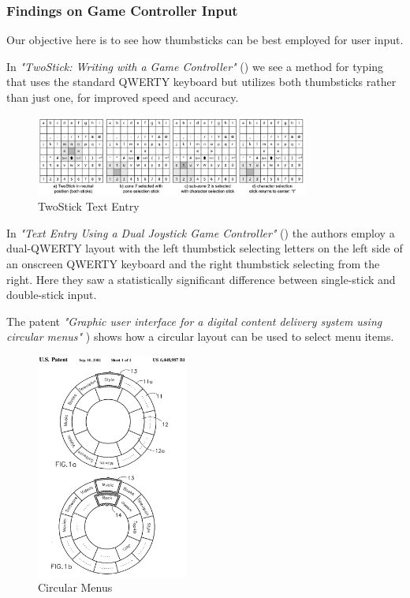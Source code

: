 \documentclass[
	letterpaper, %
]{jdf}
\begin{document}
\subsubsection{Findings on Game Controller Input}
Our objective here is to see how thumbsticks can be best employed for user input.

In \textit{"TwoStick: Writing with a Game Controller"} (\cite{twostick_2007}) we see a method for typing that uses the standard QWERTY keyboard but utilizes both thumbsticks rather than just one, for improved speed and accuracy.

\begin{figure}[h]
	\centering
	\includegraphics[width=9cm]{jdf-master/Figures/twostick.png}
	\caption{TwoStick Text Entry}
	\label{fig:twostick}
\end{figure}

In \textit{"Text Entry Using a Dual Joystick Game Controller"} (\cite{wilson_agrawala_2006}) the authors employ a dual-QWERTY layout with the left thumbstick selecting letters on the left side of an onscreen QWERTY keyboard and the right thumbstick selecting from the right. Here they saw a statistically significant difference between single-stick and double-stick input.

The patent \textit{"Graphic user interface for a digital content delivery system using circular menus"} \cite{eatsy_taplin_chechik_nelson_2002}) shows how a circular layout can be used to select menu items. 

\begin{figure}[h]
	\centering
	\includegraphics[width=5cm]{jdf-master/Figures/circularmenu.png}
	\caption{Circular Menus}
	\label{fig:circularmanu}
\end{figure}
\end{document}
